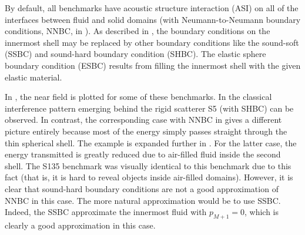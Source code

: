 By default, all benchmarks have acoustic structure interaction (ASI) on all of the interfaces between fluid and solid domains (with Neumann-to-Neumann boundary conditions, NNBC, in ). As described in , the boundary conditions on the innermost shell may be replaced by other boundary conditions like the sound-soft (SSBC) and sound-hard boundary condition (SHBC). The elastic sphere boundary condition (ESBC) results from filling the innermost shell with the given elastic material. 

In , the near field is plotted for some of these benchmarks. In  the classical interference pattern emerging behind the rigid scatterer S5 (with SHBC) can be observed. In contrast, the corresponding case with NNBC in  gives a different picture entirely because most of the energy simply passes straight through the thin spherical shell. The example is expanded further in . For the latter case, the energy transmitted is greatly reduced due to air-filled fluid inside the second shell. The S135 benchmark was visually identical to this benchmark due to this fact (that is, it is hard to reveal objects inside air-filled domains). However, it is clear that sound-hard boundary conditions are not a good approximation of NNBC in this case. The more natural approximation would be to use SSBC. Indeed, the SSBC approximate the innermost fluid with $p_{M+1}=0$, which is clearly a good approximation in this case.

